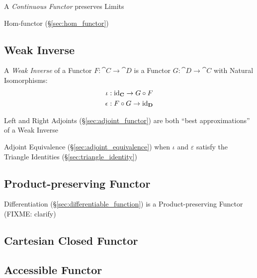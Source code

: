 A \emph{Continuous Functor} preserves Limits

Hom-functor (\S\ref{sec:hom_functor})



\subsection{Weak Inverse}\label{sec:weak_inverse}

A \emph{Weak Inverse} of a Functor $F : \cat{C} \rightarrow \cat{D}$
is a Functor $G : \cat{D} \rightarrow \cat{C}$ with Natural
Isomorphisms:
\begin{align*}
  \iota &: \mathrm{id}_\mathbf{C} \rightarrow G \circ F \\
  \epsilon &: F \circ G \rightarrow \mathrm{id}_\mathbf{D}
\end{align*}

Left and Right Adjoints (\S\ref{sec:adjoint_functor}) are both ``best
approximations'' of a Weak Inverse

Adjoint Equivalence (\S\ref{sec:adjoint_equivalence}) when $\iota$ and
$\varepsilon$ satisfy the Triangle Identities
(\S\ref{sec:triangle_identity})



\subsection{Product-preserving Functor}
\label{sec:product_preserving_functor}

\fist Differentiation (\S\ref{sec:differentiable_function}) is a
Product-preserving Functor (FIXME: clarify)



\subsection{Cartesian Closed Functor}
\label{sec:cartesian_closed_functor}

\subsection{Accessible Functor}\label{sec:accessible_functor}

